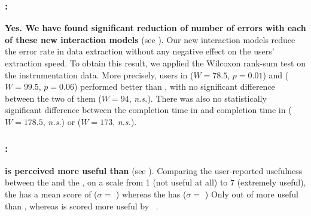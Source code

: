 \subsubsection*{\RQOneShort: \RQOne}
\textbf{Yes. We have found significant
reduction of number of errors with each of these new interaction models} (see ).
Our new interaction models reduce the error rate in data extraction without any
negative effect on the users' extraction speed. To obtain this result, we applied the
Wilcoxon rank-sum test on the instrumentation data.
More precisely, users in \BIDT ($W=78.5$, $p=0.01$) and \BIPW ($W= 99.5$, $p=0.06$)
performed better than \BI, with no significant
difference between the two of them ($W=94$, \textit{n.s.}).
There was also no statistically significant difference between the completion time in \BI and
completion time in \BIDT ($W=178.5$, \textit{n.s.}) or \BIPW{} ($W=173$, \textit{n.s.}).

\subsubsection*{\RQTwoShort: \RQTwo}
\textbf{\ConversationalClarification is perceived more useful than \ProgramNavigation} (see
).
Comparing the user-reported usefulness between the \ConversationalClarification and the \ProgramNavigation, on a
scale from 1 (not useful at all) to 7 (extremely useful), the
\ConversationalClarification has a mean score of \usefulnessDisambiguation{} ($\sigma =$
\usefulnessDisambiguationStdDev{})
whereas the \ProgramNavigation has \usefulnessProgramViewer{} ($\sigma =$ \usefulnessProgramViewerStdDev{})
Only  out of
\numPeopleSurvey{}
 \ProgramNavigation more useful than
\ConversationalClarification,
whereas \ConversationalClarification is scored more useful by
\numUserPreferringDisambiguation~.

